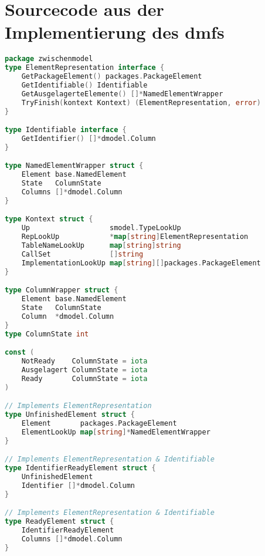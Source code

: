 \documentclass[./einleitung.tex]{subfiles}
\begin{document}
    \section{Sourcecode aus der Implementierung des \acrshort{dmf}s}\label{sec:dateien-aus-der-implementierung-des-dmfs}
    \begin{lstlisting}[language=Go, caption=Zwischenmodell für die Datenbankmodell-Generation ohne Implementierung der Methoden, label=zmodel]
package zwischenmodel
type ElementRepresentation interface {
	GetPackageElement() packages.PackageElement
	GetIdentifiable() Identifiable
	GetAusgelagerteElemente() []*NamedElementWrapper
	TryFinish(kontext Kontext) (ElementRepresentation, error)
}

type Identifiable interface {
	GetIdentifier() []*dmodel.Column
}

type NamedElementWrapper struct {
	Element base.NamedElement
	State   ColumnState
	Columns []*dmodel.Column
}

type Kontext struct {
	Up                   smodel.TypeLookUp
	RepLookUp            *map[string]ElementRepresentation
	TableNameLookUp      map[string]string
	CallSet              []string
	ImplementationLookUp map[string][]packages.PackageElement
}

type ColumnWrapper struct {
	Element base.NamedElement
	State   ColumnState
	Column  *dmodel.Column
}
type ColumnState int

const (
	NotReady    ColumnState = iota
	Ausgelagert ColumnState = iota
	Ready       ColumnState = iota
)

// Implements ElementRepresentation
type UnfinishedElement struct {
	Element       packages.PackageElement
	ElementLookUp map[string]*NamedElementWrapper
}

// Implements ElementRepresentation & Identifiable
type IdentifierReadyElement struct {
	UnfinishedElement
	Identifier []*dmodel.Column
}

// Implements ElementRepresentation & Identifiable
type ReadyElement struct {
	IdentifierReadyElement
	Columns []*dmodel.Column
}
    \end{lstlisting}
\end{document}
